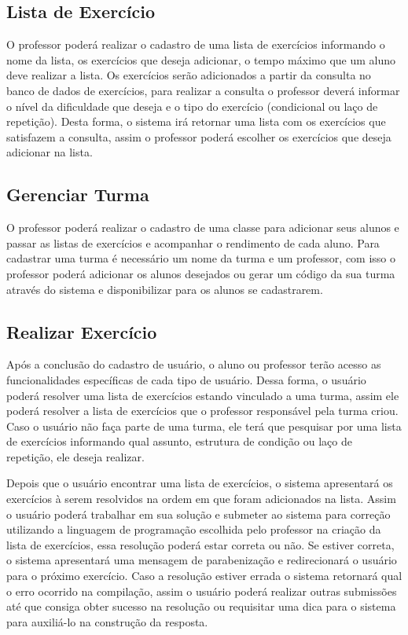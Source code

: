 \subsection{Lista de Exercício}

O professor poderá realizar o cadastro de uma lista de exercícios informando o nome da lista, os exercícios que deseja adicionar, o tempo máximo que um aluno deve realizar a lista. Os exercícios serão adicionados a partir da consulta no banco de dados de exercícios, para realizar a consulta o professor deverá informar o nível da dificuldade que deseja e o tipo do exercício (condicional ou laço de repetição). Desta forma, o sistema irá retornar uma lista com os exercícios que satisfazem a consulta, assim o professor poderá escolher os exercícios que deseja adicionar na lista.

\subsection{Gerenciar Turma}

O professor poderá realizar o cadastro de uma classe para adicionar seus alunos e passar as listas de exercícios e acompanhar o rendimento de cada aluno. Para cadastrar uma turma é necessário um nome da turma e um professor, com isso o professor poderá adicionar os alunos desejados ou gerar um código da sua turma através do sistema e disponibilizar para os alunos se cadastrarem.

\subsection{Realizar Exercício}

Após a conclusão do cadastro de usuário, o aluno ou professor terão acesso as funcionalidades específicas de cada tipo de usuário. Dessa forma, o usuário poderá resolver uma lista de exercícios estando vinculado a uma turma, assim ele poderá resolver a lista de exercícios que o professor responsável pela turma criou. Caso o usuário não faça parte de uma turma, ele terá que pesquisar por uma lista de exercícios informando qual assunto, estrutura de condição ou laço de repetição, ele deseja realizar. 

Depois que o usuário encontrar uma lista de exercícios, o sistema apresentará os exercícios à serem resolvidos na ordem em que foram adicionados na lista. Assim o usuário poderá trabalhar em sua solução e submeter ao sistema para correção utilizando a linguagem de programação escolhida pelo professor na criação da lista de exercícios, essa resolução poderá estar correta ou não. Se estiver correta, o sistema apresentará uma mensagem de parabenização e redirecionará o usuário para o próximo exercício. Caso a resolução estiver errada o sistema retornará qual o erro ocorrido na compilação, assim o usuário poderá realizar outras submissões até que consiga obter sucesso na resolução ou requisitar uma dica para o sistema para auxiliá-lo na construção da resposta. 

